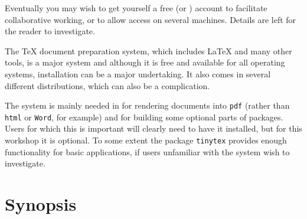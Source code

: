 \documentclass[12pt]{article}
\begin{document}
\begin{description}
  Eventually you may wish to get yourself a free \github (or \gitlab)
  account to facilitate collaborative working, or to allow access on
  several machines.  Details are left for the reader to investigate.
  
\item[\TeX{} and \LaTeX] The \TeX{} document preparation system, which
  includes \LaTeX{} and many other tools, is a major system and
  although it is free and available for all operating systems,
  installation can be a major undertaking.  It also comes in several
  different distributions, which can also be a complication.

  The system is mainly needed in \R for rendering documents into
  \verb|pdf| (rather than \verb|html| or \verb|Word|, for example) and
  for building some optional parts of \R packages.  Users for which
  this is important will clearly need to have it installed, but for
  this workshop it is optional.  To some extent the \R package
  \verb|tinytex| provides enough functionality for basic applications,
  if users unfamiliar with the system wish to investigate.
  

\end{description}

\section{Synopsis}
\label{sec:synopsis}
\end{document}
